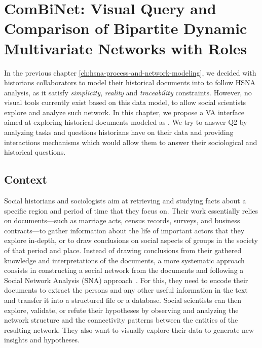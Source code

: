 \chapter{ComBiNet: Visual Query and Comparison of Bipartite Dynamic Multivariate Networks with Roles}\label{ch:combinet}

In the previous chapter \autoref{ch:hsna-process-and-network-modeling}, we decided with historians collaborators to model their historical documents into \modelplural to follow HSNA analysis, as it satisfy \emph{simplicity}, \emph{reality} and \emph{traceability} constraints.
However, no visual tools currently exist based on this data model, to allow social scientists explore and analyze such network.
In this chapter, we propose a VA interface aimed at exploring historical documents modeled as \modelplural.
We try to answer Q2 by analyzing tasks and questions historians have on their data and providing interactions mechanisms which would allow them to answer their sociological and historical questions.



\section{Context}

Social historians and sociologists aim at retrieving and studying facts about a specific region and period of time that they focus on.
Their work essentially relies on documents---such as marriage acts, census records, surveys, and business contracts---to gather information about the life of important actors that they explore in-depth, or to draw conclusions on social aspects of groups in the society of that period and place.
Instead of drawing conclusions from their gathered knowledge and interpretations of the documents, a more systematic approach consists in constructing a social network from the documents and following a Social Network Analysis (SNA) approach~\cite{wetherellHistoricalSocialNetwork1998}.
For this, they need to encode their documents to extract the persons and any other useful information in the text and transfer it into a structured file or a database.
Social scientists can then explore, validate, or refute their hypotheses by observing and analyzing the network structure and the connectivity patterns between the entities of the resulting network.
They also want to visually explore their data to generate new insights and hypotheses.

